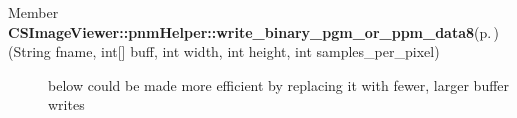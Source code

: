 \label{todo__todo000005}
 \begin{description}
\item[Member {\bf CSImage\-Viewer::pnm\-Helper::write\_\-binary\_\-pgm\_\-or\_\-ppm\_\-data8}{\rm (p.\,\pageref{class_c_s_image_viewer_1_1pnm_helper_60a4449366845ae713e39edda7adfed1})}(String fname, int\mbox{[}\mbox{]} buff, int width, int height, int samples\_\-per\_\-pixel) ]below could be made more efficient by replacing it with fewer, larger buffer writes \end{description}
